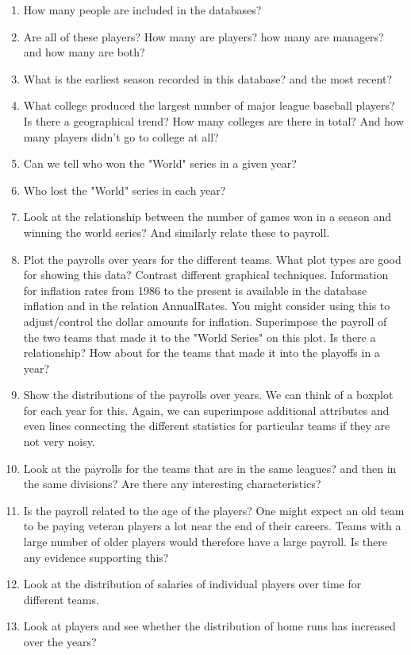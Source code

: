 \begin{enumerate}
\item How many people are included in the databases?
\item Are all of these players? How many are players? how many are managers? and how many are both?
\item     What is the earliest season recorded in this database? and the most recent?
\item  What college produced the largest number of major league baseball players? Is there a geographical trend? How many colleges are there in total? And how many players didn't go to college at all?
\item  Can we tell who won the "World" series in a given year?
\item  Who lost the "World" series in each year?
\item Look at the relationship between the number of games won in a season and winning the world series? And similarly relate these to payroll.
\item  Plot the payrolls over years for the different teams. What plot types are good for showing this data? Contrast different graphical techniques. Information for inflation rates from 1986 to the present is available in the database inflation and in the relation AnnualRates. You might consider using this to adjust/control the dollar amounts for inflation.
      Superimpose the payroll of the two teams that made it to the "World Series" on this plot. Is there a relationship? How about for the teams that made it into the playoffs in a year?
\item Show the distributions of the payrolls over years. We can think of a boxplot for each year for this. Again, we can superimpose additional attributes and even lines connecting the different statistics for particular teams if they are not very noisy.
\item  Look at the payrolls for the teams that are in the same leagues? and then in the same divisions? Are there any interesting characteristics?
\item Is the payroll related to the age of the players? One might expect an old team to be paying veteran players a lot near the end of their careers. Teams with a large number of older players would therefore have a large payroll. Is there any evidence supporting this?
\item Look at the distribution of salaries of individual players over time for different teams.
\item Look at players and see whether the distribution of home runs has increased over the years?

\end{enumerate}
